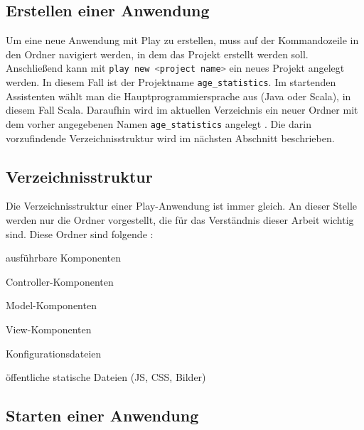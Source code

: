 \subsection{Erstellen einer Anwendung} %
\label{sub:erstellen_einer_anwendung}

Um eine neue Anwendung mit Play zu erstellen, muss auf der Kommandozeile in den Ordner navigiert werden, in dem das Projekt erstellt werden soll.
Anschließend kann mit \lstinline[language=sh]|play new <project name>| ein neues Projekt angelegt werden.
In diesem Fall ist der Projektname \lstinline|age_statistics|.
Im startenden Assistenten wählt man die Hauptprogrammiersprache aus (Java oder Scala), in diesem Fall Scala.
Daraufhin wird im aktuellen Verzeichnis ein neuer Ordner mit dem vorher angegebenen Namen \lstinline|age_statistics| angelegt \cite[vgl.][S.~10]{play_for_scala_v8}.
Die darin vorzufindende Verzeichnisstruktur wird im nächsten Abschnitt beschrieben.



\subsection{Verzeichnisstruktur} %
\label{sub:verzeichnisstruktur}

Die Verzeichnisstruktur einer Play-Anwendung ist immer gleich.
An dieser Stelle werden nur die Ordner vorgestellt, die für das Verständnis dieser Arbeit wichtig sind.
Diese Ordner sind folgende \cite[vgl.][]{play_verzeichnisstruktur}:

\begin{description}[leftmargin=!,labelwidth=\widthof{\bfseries app/controllers/}]
  \item[app/] ausführbare Komponenten
  \item[app/controllers/] Controller-Komponenten
  \item[app/models/] Model-Komponenten
  \item[app/views/] View-Komponenten
  \item[conf/] Konfigurationsdateien
  \item[public/] öffentliche statische Dateien (JS, CSS, Bilder)
\end{description}



\subsection{Starten einer Anwendung} %
\label{sub:starten_einer_anwendung}

